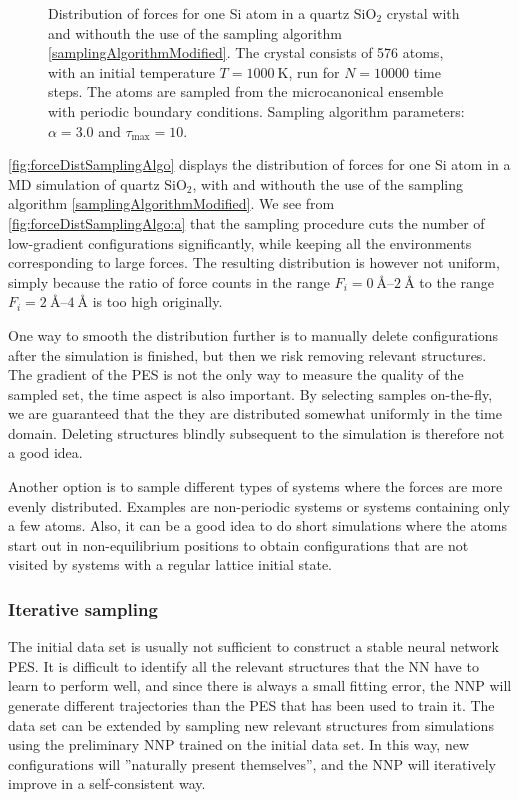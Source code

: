 \documentclass[twoside,english]{uiofysmaster}
\begin{document}
\begin{figure}
\begin{minipage}{0.48\linewidth}
 \label{fig:forceDistSapmlingAlgo:b}
\end{minipage}
\vspace{-1ex}
  \caption{Distribution of forces for one Si atom in a quartz $\textrm{SiO}_2$ crystal with 
	   and withouth the use of the sampling algorithm \eqref{samplingAlgorithmModified}. 
	   The crystal consists of 576 atoms, with an initial temperature $T= \SI{1000}{\kelvin}$, 
	   run for $N = 10000$ time steps. The atoms are sampled from the microcanonical ensemble with
	   periodic boundary conditions.
	   Sampling algorithm parameters: $\alpha=3.0$ and 
	   $\tau_\textrm{max} = 10$.}
\label{fig:forceDistSamplingAlgo}
\end{figure}
\autoref{fig:forceDistSamplingAlgo} displays the distribution of forces for one Si atom in a MD simulation
of quartz $\textrm{SiO}_2$, with and withouth the use of the sampling algorithm \eqref{samplingAlgorithmModified}. 
We see from \autoref{fig:forceDistSamplingAlgo:a} that the 
sampling procedure cuts the number of low-gradient configurations significantly, 
while keeping all the environments corresponding to large forces. The resulting distribution is however not uniform, simply
because the ratio of force counts in the range $F_i = \SIrange{0}{2}{\angstrom}$ to the range $F_i = \SIrange{2}{4}{\angstrom}$
is too high originally.

One way to smooth the distribution further is to manually delete configurations after the simulation 
is finished, but then we risk removing relevant structures. The gradient of the PES is not the only way 
to measure the quality of the sampled set, the time aspect is also important. 
By selecting samples on-the-fly, we are guaranteed that the they are distributed somewhat uniformly in the time domain. 
Deleting structures blindly subsequent to the simulation is therefore not a good idea.

Another option is to sample different types of systems where the forces are more evenly distributed. 
Examples are non-periodic systems or systems containing only a few atoms. Also, it can be a good idea 
to do short simulations where the atoms start out in non-equilibrium positions to obtain configurations
that are not visited by systems with a regular lattice initial state. 

\subsubsection{Iterative sampling}
The initial data set is usually not sufficient to construct a stable neural network PES. 
It is difficult to identify all the relevant structures that the NN have to learn to perform well, and 
since there is always a small fitting error, the 
NNP will generate different trajectories than the PES that has been used to train it. The data set can be extended
by sampling new relevant structures from simulations using the preliminary NNP trained on the initial data set. 
In this way, new configurations
will ''naturally present themselves'', and the NNP will iteratively improve in a self-consistent way.
\end{document}
